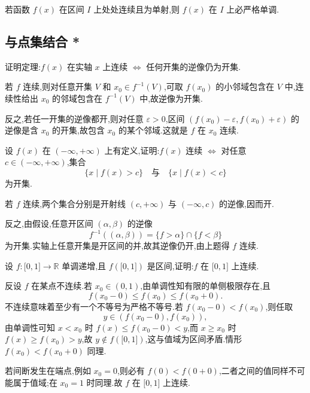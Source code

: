 \begin{corollary}[\markstar]
    若函数 $f(x)$ 在区间 $I$ 上处处连续且为单射,则 $f(x)$ 在 $I$ 上必严格单调.
\end{corollary}



\subsection{与点集结合 *}

\begin{example}
    证明定理:$f(x)$ 在实轴 $x$ 上连续 $\Longleftrightarrow$ 任何开集的逆像仍为开集.
\end{example}
\exampleblank

\begin{solution}
    若 $f$ 连续,则对任意开集 $V$ 和 $x_0\in f^{-1}(V)$,可取 $f(x_0)$ 的小邻域包含在 $V$ 中,连续性给出 $x_0$ 的邻域包含在 $f^{-1}(V)$ 中,故逆像为开集.

    反之,若任一开集的逆像都开,则对任意 $\varepsilon>0$,区间 $(f(x_0)-\varepsilon,f(x_0)+\varepsilon)$ 的逆像是含 $x_0$ 的开集,故包含 $x_0$ 的某个邻域.这就是 $f$ 在 $x_0$ 连续.
\end{solution}

\begin{example}
    设 $f(x)$ 在 $(-\infty,+\infty)$ 上有定义,证明:$f(x)$ 连续 $\Longleftrightarrow$ 对任意 $c\in(-\infty,+\infty)$,集合
    \[
        \{x\mid f(x)>c\} \quad\text{与}\quad \{x\mid f(x)<c\}
    \]
    为开集.
\end{example}
\exampleblank

\begin{solution}
    若 $f$ 连续,两个集合分别是开射线 $(c,+\infty)$ 与 $(-\infty,c)$ 的逆像,因而开.

    反之,由假设,任意开区间 $(\alpha,\beta)$ 的逆像
    \[
        f^{-1}((\alpha,\beta))=\{f>\alpha\}\cap\{f<\beta\}
    \]
    为开集.实轴上任意开集是开区间的并,故其逆像仍开,由上题得 $f$ 连续.
\end{solution}

\begin{example}
    设 $f:\lbrack 0,1\rbrack\to\mathbb{R}$ 单调递增,且 $f(\lbrack 0,1\rbrack)$ 是区间,证明:$f$ 在 $\lbrack 0,1\rbrack$ 上连续.
\end{example}
\exampleblank

\begin{solution}
    反设 $f$ 在某点不连续.若 $x_0\in(0,1)$,由单调性知有限的单侧极限存在,且
    \[
        f(x_0-0)\leq f(x_0)\leq f(x_0+0).
    \]
    不连续意味着至少有一个不等号为严格不等号.若 $f(x_0-0)<f(x_0)$,则任取
    \[
        y\in(f(x_0-0),f(x_0)),
    \]
    由单调性可知 $x<x_0$ 时 $f(x)\leq f(x_0-0)<y$,而 $x\geq x_0$ 时 $f(x)\geq f(x_0)>y$,故 $y\notin f(\lbrack0,1\rbrack)$,这与值域为区间矛盾.情形 $f(x_0)<f(x_0+0)$ 同理.

    若间断发生在端点,例如 $x_0=0$,则必有 $f(0)<f(0+0)$,二者之间的值同样不可能属于值域;在 $x_0=1$ 时同理.故 $f$ 在 $\lbrack0,1\rbrack$ 上连续.
\end{solution}

